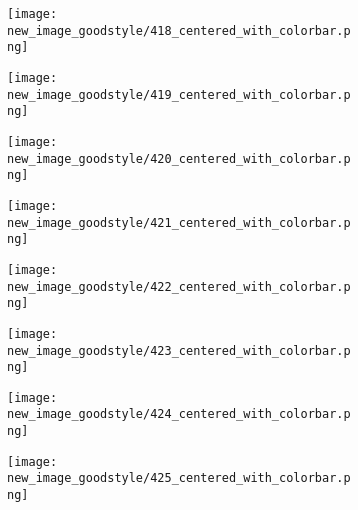 \documentclass[a4paper,12pt]{article}
\begin{document}
\begin{figure}[H]
  \begin{subfigure}{0.11\textwidth}
    \texttt{[image: new\_image\_goodstyle/418\_centered\_with\_colorbar.png]}
  \end{subfigure}
  \hfill
  \begin{subfigure}{0.11\textwidth}
    \texttt{[image: new\_image\_goodstyle/419\_centered\_with\_colorbar.png]}
  \end{subfigure}
  \hfill
  \begin{subfigure}{0.11\textwidth}
    \texttt{[image: new\_image\_goodstyle/420\_centered\_with\_colorbar.png]}
  \end{subfigure}
  \hfill
  \begin{subfigure}{0.11\textwidth}
    \texttt{[image: new\_image\_goodstyle/421\_centered\_with\_colorbar.png]}
  \end{subfigure}
  \hfill
  \begin{subfigure}{0.11\textwidth}
    \texttt{[image: new\_image\_goodstyle/422\_centered\_with\_colorbar.png]}
  \end{subfigure}
  \hfill
  \begin{subfigure}{0.11\textwidth}
    \texttt{[image: new\_image\_goodstyle/423\_centered\_with\_colorbar.png]}
  \end{subfigure}
  \hfill
  \begin{subfigure}{0.11\textwidth}
    \texttt{[image: new\_image\_goodstyle/424\_centered\_with\_colorbar.png]}
  \end{subfigure}
  \hfill
  \begin{subfigure}{0.11\textwidth}
    \texttt{[image: new\_image\_goodstyle/425\_centered\_with\_colorbar.png]}
  \end{subfigure}
  \hfill
\end{figure}
\end{document}
